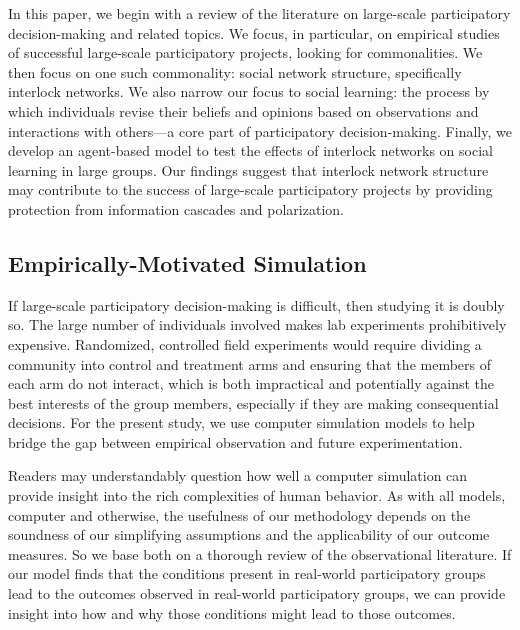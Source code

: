 \documentclass[manuscript,screen,review,acmsmall]{acmart}
\begin{document}
In this paper, we begin with a review of the literature on large-scale participatory decision-making and related topics.
We focus, in particular, on empirical studies of successful large-scale participatory projects, looking for commonalities.
We then focus on one such commonality: social network structure,
specifically interlock networks.
We also narrow our focus to social learning:
the process by which individuals revise their beliefs and opinions
based on observations and interactions with others---a core part of participatory decision-making.
Finally, we develop an agent-based model
to test the effects of interlock networks on social learning
in large groups.
Our findings suggest that interlock network structure may contribute to the success of large-scale participatory projects by providing protection from information cascades and polarization.

\subsection{Empirically-Motivated Simulation}

If large-scale participatory decision-making is difficult,
then studying it is doubly so.
The large number of individuals involved makes lab experiments prohibitively expensive.
Randomized, controlled field experiments would require dividing
a community into control and treatment arms
and ensuring that the members of each
arm do not interact,
which is both impractical and potentially
against the best interests of the group members,
especially if they are making consequential decisions.
For the present study, we use computer simulation models to help bridge the gap
between empirical observation and future experimentation.

Readers may understandably question how well a computer simulation can provide insight into the rich complexities of human behavior.
As with all models, computer and otherwise,
the usefulness of our methodology depends on the soundness of our simplifying assumptions and the applicability of our outcome measures.
So we base both on a thorough review of the observational literature.
If our model finds that the conditions present in real-world participatory groups lead to the outcomes observed in real-world participatory groups,
we can provide insight into how and why those conditions might lead to those outcomes.
\end{document}
